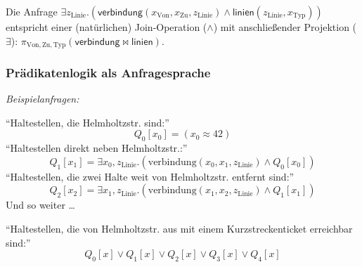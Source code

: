\documentclass[aspectratio=1610,onlymath]{beamer}
\begin{document}
\begin{frame}
Die Anfrage \alert{$\exists z_{\text{Linie}}.(\textsf{verbindung}(x_\text{Von},x_\text{Zu}, z_{\text{Linie}})\wedge \textsf{linien}(z_{\text{Linie}},x_{\text{Typ}}))$}
entspricht einer (natürlichen) Join-Operation ($\wedge$) mit anschließender Projektion ($\exists$):
\alert{$\pi_{\text{Von},\text{Zu},\text{Typ}}(\textsf{verbindung}\bowtie\textsf{linien})$}.

\end{frame}

\begin{frame}\frametitle{Prädikatenlogik als Anfragesprache}

\emph{Beispielanfragen:}\medskip

\alert{``Haltestellen, die Helmholtzstr. sind:''}
%
\[ Q_0[x_0] = (x_0\approx 42) \]\pause
%
\alert{``Haltestellen direkt neben Helmholtzstr.:''}
\[
   Q_1[x_1] = \exists x_0,z_\text{Linie}.(\text{verbindung}(x_0,x_1,z_\text{Linie})\wedge Q_0[x_0])
\]\pause
\alert{``Haltestellen, die zwei Halte weit von Helmholtzstr. entfernt sind:''}
\[
   Q_2[x_2] = \exists x_1,z_\text{Linie}.(\text{verbindung}(x_1,x_2,z_\text{Linie})\wedge Q_1[x_1])
\]\pause
Und so weiter \ldots\bigskip
% 

\alert{``Haltestellen, die von Helmholtzstr. aus mit einem Kurzstreckenticket erreichbar sind:''}
\[
	Q_0[x]\vee Q_1[x]\vee Q_2[x]\vee Q_3[x]\vee Q_4[x]
\]
% 
% 
\end{frame}
\end{document}
